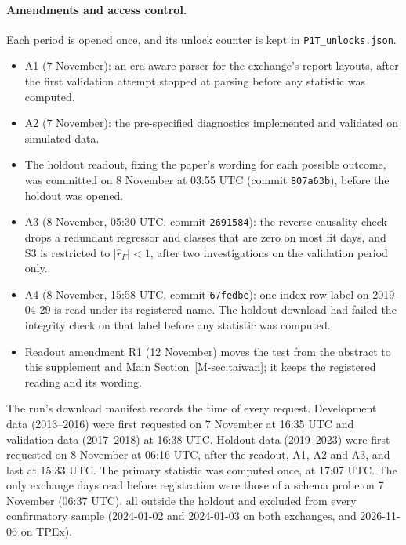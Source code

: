 \documentclass[12pt]{article}
\theoremstyle{definition}
\theoremstyle{remark}
\begin{document}
\paragraph{Amendments and access control.} Each period is opened once, and its unlock counter is kept in \nolinkurl{P1T_unlocks.json}.
\begin{itemize}[itemsep=1pt,topsep=2pt]
\item A1 (7 November): an era-aware parser for the exchange's report layouts, after the first validation attempt stopped at parsing before any statistic was computed.
\item A2 (7 November): the pre-specified diagnostics implemented and validated on simulated data.
\item The holdout readout, fixing the paper's wording for each possible outcome, was committed on 8 November at 03:55 UTC (commit \texttt{807a63b}), before the holdout was opened.
\item A3 (8 November, 05:30 UTC, commit \texttt{2691584}): the reverse-causality check drops a redundant regressor and classes that are zero on most fit days, and S3 is restricted to $|\hat r_F| < 1$, after two investigations on the validation period only.
\item A4 (8 November, 15:58 UTC, commit \texttt{67fedbe}): one index-row label on 2019-04-29 is read under its registered name. The holdout download had failed the integrity check on that label before any statistic was computed.
\item Readout amendment R1 (12 November) moves the test from the abstract to this supplement and Main Section~\ref{M-sec:taiwan}; it keeps the registered reading and its wording.
\end{itemize}
The run's download manifest records the time of every request. Development data (2013--2016) were first requested on 7 November at 16:35 UTC and validation data (2017--2018) at 16:38 UTC. Holdout data (2019--2023) were first requested on 8 November at 06:16 UTC, after the readout, A1, A2 and A3, and last at 15:33 UTC. The primary statistic was computed once, at 17:07 UTC. The only exchange days read before registration were those of a schema probe on 7 November (06:37 UTC), all outside the holdout and excluded from every confirmatory sample (2024-01-02 and 2024-01-03 on both exchanges, and 2026-11-06 on TPEx).
\end{document}

